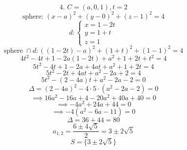 \documentclass{article}
\begin{document}
\[ \text{4. } C = (a, 0, 1), t = 2 \]
\[ \text{sphere: } (x-a)^2 + (y-0)^2 + (z-1)^2 = 4 \]
\[ d: \begin{cases} x = 1-2t \\ y = 1+t \\ z = 1 \end{cases} \]
\[ \text{sphere } \cap d: ((1-2t)-a)^2 + (1+t)^2 + (1-1)^2 = 4 \]
\[ 4t^2 - 4t + 1 - 2a(1-2t) + a^2 + 1 + 2t + t^2 = 4 \]
\[ 5t^2 - 4t + 1 - 2a + 4at + a^2 + 1 + 2t = 4 \]
\[ 5t^2 - 2t + 4at + a^2 - 2a + 2 = 4 \]
\[ 5t^2 - (2-4a)t + a^2 - 2a - 2 = 0 \]
\[ \Delta = (2-4a)^2 - 4 \cdot 5 \cdot (a^2 - 2a - 2) = 0 \]
\[ \implies 16a^2 - 16a + 4 - 20a^2 + 40a + 40 = 0 \]
\[ \implies -4a^2 + 24a + 44 = 0 \]
\[ \implies -4(a^2 - 6a - 11) = 0 \]
\[ \Delta = 36 + 44 = 80 \]
\[ a_{1,2} = \frac{6 \pm 4\sqrt{5}}{2} = 3 \pm 2\sqrt{5} \]
\[ S = \{3 \pm 2\sqrt{5}\} \]
\end{document}
